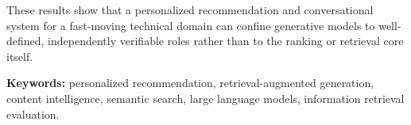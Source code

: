 These results show that a personalized recommendation and conversational system for a fast-moving technical domain can confine generative models to well-defined, independently verifiable roles rather than to the ranking or retrieval core itself.

\bigskip
\noindent\textbf{Keywords:} personalized recommendation, retrieval-augmented generation, content intelligence, semantic search, large language models, information retrieval evaluation.
